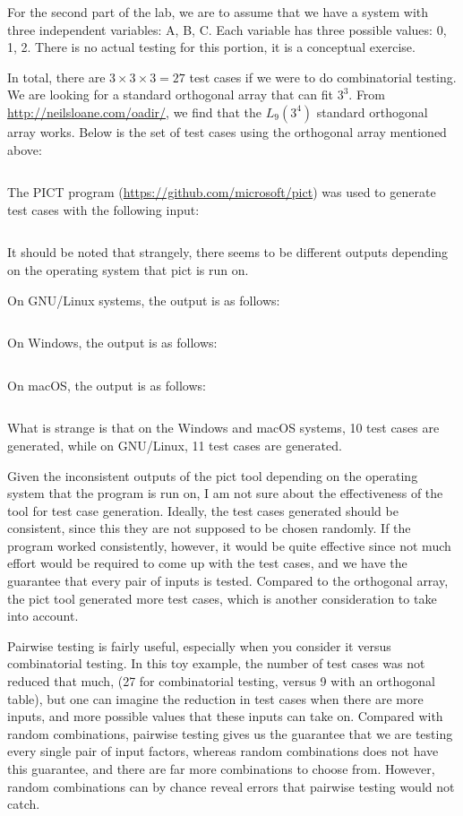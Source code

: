 For the second part of the lab, we are to assume that we have a system with
three independent variables: A, B, C. Each variable has three possible values:
0, 1, 2. There is no actual testing for this portion, it is a conceptual
exercise.

In total, there are $3 \times 3 \times 3  = 27$ test cases if we were to do
combinatorial testing. We are looking for a standard orthogonal array that
can fit $3^3$. From \url{http://neilsloane.com/oadir/}, we find that
the $L_9(3^4)$ standard orthogonal array works.
Below is the set of test cases using the orthogonal array mentioned above:

\inputminted{text}{resources/standard3^4}

The PICT program (\url{https://github.com/microsoft/pict}) was used to generate
test cases with the following input:

\inputminted{text}{resources/pict}

It should be noted that strangely, there seems to be different outputs
depending on the operating system that pict is run on.

On GNU/Linux systems, the output is as follows:
\inputminted{text}{resources/pictlinux}

On Windows, the output is as follows:
\inputminted{text}{resources/pictwindoze}

On macOS, the output is as follows:
\inputminted{text}{resources/pictmacos}

What is strange is that on the Windows and macOS systems, 10 test cases are
generated, while on GNU/Linux, 11 test cases are generated.

Given the inconsistent outputs of the pict tool depending on the operating
system that the program is run on, I am not sure about the effectiveness of the
tool for test case generation. Ideally, the test cases generated should be
consistent, since this they are not supposed to be chosen randomly. If the
program worked consistently, however, it would be quite effective since not
much effort would be required to come up with the test cases, and we have the
guarantee that every pair of inputs is tested.
Compared to the orthogonal array, the pict tool generated more test cases,
which is another consideration to take into account.


Pairwise testing is fairly useful, especially when you consider it versus
combinatorial testing. In this toy example, the number of test cases was not
reduced that much, (27 for combinatorial testing, versus 9 with an orthogonal
table), but one can imagine the reduction in test cases when there are more
inputs, and more possible values that these inputs can take on. Compared with
random combinations, pairwise testing gives us the guarantee that we are
testing every single pair of input factors, whereas random combinations
does not have this guarantee, and there are far more combinations to choose
from. However, random combinations can by chance reveal errors that pairwise
testing would not catch.

